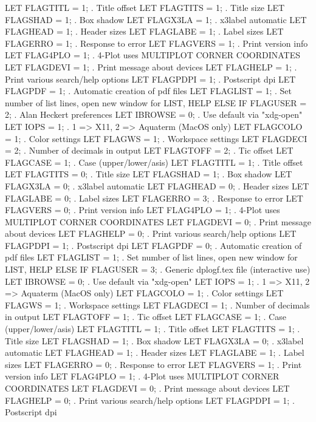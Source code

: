    LET FLAGTITL = 1;  . Title offset
   LET FLAGTITS = 1;  . Title size
   LET FLAGSHAD = 1;  . Box shadow
   LET FLAGX3LA = 1;  . x3label automatic
   LET FLAGHEAD = 1;  . Header sizes
   LET FLAGLABE = 1;  . Label sizes
   LET FLAGERRO = 1;  . Response to error
   LET FLAGVERS = 1;  . Print version info
   LET FLAG4PLO = 1;  . 4-Plot uses MULTIPLOT CORNER COORDINATES
   LET FLAGDEVI = 1;  . Print message about devices
   LET FLAGHELP = 1;  . Print various search/help options
   LET FLAGPDPI = 1;  . Postscript dpi
   LET FLAGPDF  = 1;  . Automatic creation of pdf files
   LET FLAGLIST = 1;  . Set number of list lines, open new window for LIST, HELP
ELSE IF FLAGUSER = 2; . Alan Heckert preferences
   LET IBROWSE = 0;   . Use default via "xdg-open"
   LET IOPS = 1;      . 1 => X11, 2 => Aquaterm (MacOS only)
   LET FLAGCOLO = 1;  . Color settings
   LET FLAGWS = 1;    . Workspace settings
   LET FLAGDECI = 2;  . Number of decimals in output
   LET FLAGTOFF = 2;  . Tic offset
   LET FLAGCASE = 1;  . Case (upper/lower/asis)
   LET FLAGTITL = 1;  . Title offset
   LET FLAGTITS = 0;  . Title size
   LET FLAGSHAD = 1;  . Box shadow
   LET FLAGX3LA = 0;  . x3label automatic
   LET FLAGHEAD = 0;  . Header sizes
   LET FLAGLABE = 0;  . Label sizes
   LET FLAGERRO = 3;  . Response to error
   LET FLAGVERS = 0;  . Print version info
   LET FLAG4PLO = 1;  . 4-Plot uses MULTIPLOT CORNER COORDINATES
   LET FLAGDEVI = 0;  . Print message about devices
   LET FLAGHELP = 0;  . Print various search/help options
   LET FLAGPDPI = 1;  . Postscript dpi
   LET FLAGPDF  = 0;  . Automatic creation of pdf files
   LET FLAGLIST = 1;  . Set number of list lines, open new window for LIST, HELP
ELSE IF FLAGUSER = 3; . Generic dplogf.tex file (interactive use)
   LET IBROWSE = 0;   . Use default via "xdg-open"
   LET IOPS = 1;      . 1 => X11, 2 => Aquaterm (MacOS only)
   LET FLAGCOLO = 1;  . Color settings
   LET FLAGWS = 1;    . Workspace settings
   LET FLAGDECI = 1;  . Number of decimals in output
   LET FLAGTOFF = 1;  . Tic offset
   LET FLAGCASE = 1;  . Case (upper/lower/asis)
   LET FLAGTITL = 1;  . Title offset
   LET FLAGTITS = 1;  . Title size
   LET FLAGSHAD = 1;  . Box shadow
   LET FLAGX3LA = 0;  . x3label automatic
   LET FLAGHEAD = 1;  . Header sizes
   LET FLAGLABE = 1;  . Label sizes
   LET FLAGERRO = 0;  . Response to error
   LET FLAGVERS = 1;  . Print version info
   LET FLAG4PLO = 1;  . 4-Plot uses MULTIPLOT CORNER COORDINATES
   LET FLAGDEVI = 0;  . Print message about devices
   LET FLAGHELP = 0;  . Print various search/help options
   LET FLAGPDPI = 1;  . Postscript dpi
